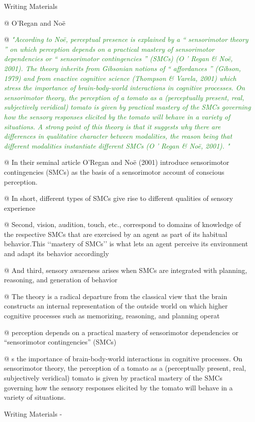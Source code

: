 \documentclass[utf8]{article}
\newenvironment{WritingMaterials} %
    	{
            \begin{tcolorbox}[enhanced,
                title=-,
                size=small,
                colbacktitle=Aquamarine,
                drop fuzzy shadow,
                fontupper=\small,
                boxrule=0.4pt,
                colback=Aquamarine!10!white,
                sharp corners]
                Writing Materials
            \end{tcolorbox}
            \begin{easylist}[itemize]
    	}
    	{
            \end{easylist}  
            \begin{tcolorbox}[enhanced,
                halign=flush right,
                halign title=right,
                size=small,
                colbacktitle=Aquamarine,
                drop fuzzy shadow,
                fontupper=\small,
                boxrule=0.4pt,
                colback=Aquamarine,
                colupper=White,
                sharp corners]
                Writing Materials -
            \end{tcolorbox}        
    	}
\newcommand{\rewrite}[1]{\textcolor{ForestGreen}{\textit{"#1"}}\newline}
\begin{document}
			\begin{WritingMaterials} %

				@ O’Regan and Noë


				@ \rewrite{According to Noë, perceptual presence is explained by a “ sensorimotor theory ” on which perception depends on a practical mastery of sensorimotor dependencies or “ sensorimotor contingencies ” (SMCs) (O ’ Regan \& Noë, 2001). The theory inherits from Gibsonian notions of “ affordances ” (Gibson, 1979) and from enactive cognitive science (Thompson \& Varela, 2001) which stress the importance of brain-body-world interactions in cognitive processes. On sensorimotor theory, the perception of a tomato as a (perceptually present, real, subjectively veridical) tomato is given by practical mastery of the SMCs governing how the sensory responses elicited by the tomato will behave in a variety of situations. A strong point of this theory is that it suggests why there are differences in qualitative character between modalities, the reason being that different modalities instantiate different SMCs (O ’ Regan \& Noë, 2001). }

				@ In their seminal article O’Regan and Noë (2001) introduce sensorimotor contingencies (SMCs) as the basis of a sensorimotor account of conscious perception.

				@ In short, different types of SMCs give rise to different qualities of sensory experience

				@  Second, vision, audition, touch, etc., correspond to domains of knowledge of the respective SMCs that are exercised by an agent as part of its habitual behavior.This ‘‘mastery of SMCs’’ is what lets an agent perceive its environment and adapt its behavior accordingly

				@ And third, sensory awareness arises when SMCs are integrated with planning, reasoning, and generation of behavior

				@ The theory is a radical departure from the classical view that the brain constructs an internal representation of the outside world on which higher cognitive processes such as memorizing, reasoning, and planning operat

				@ perception depends on a practical mastery of sensorimotor dependencies or “sensorimotor contingencies” (SMCs)

				@ s the importance of brain-body-world interactions in cognitive processes. On sensorimotor theory, the perception of a tomato as a (perceptually present, real, subjectively veridical) tomato is given by practical mastery of the SMCs governing how the sensory responses elicited by the tomato will behave in a variety of situations.


\end{WritingMaterials}
\end{document}
